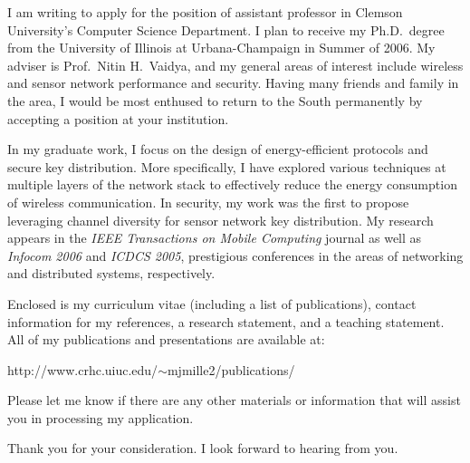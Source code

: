 \documentclass[10pt,stdletter]{newlfm}
\begin{document}
\begin{newlfm}

I am writing to apply for the position of assistant
professor in Clemson University's Computer Science Department.  I plan to receive my
Ph.D.\ degree from the University of Illinois at
Urbana-Champaign in Summer of 2006.  My adviser is
Prof.\ Nitin H.\ Vaidya, and my general areas of interest
include wireless and sensor network performance and security.
 Having many friends and family in the area, I would be
most enthused to return to the South permanently by accepting
a position at your institution.

In my graduate work, I focus on the design of
energy-efficient protocols and secure key distribution.
More specifically, I have explored various techniques at
multiple layers of the network stack to effectively reduce
the energy consumption of wireless communication.  In security,
my work was the first to propose leveraging channel diversity
for sensor network key distribution.  My research appears in 
the \textit{IEEE Transactions on Mobile Computing} journal as
well as \textit{Infocom 2006} and \textit{ICDCS 2005},
prestigious conferences in the areas of networking and distributed
systems, respectively.

Enclosed is my curriculum vitae (including a list of
publications), contact information for my references, a research
statement, and a teaching statement.  All of my publications and
presentations are available at:

http://www.crhc.uiuc.edu/$\sim$mjmille2/publications/

Please let me know if there are any other materials
or information that will assist you in processing my application.

Thank you for your consideration.  I look forward to
hearing from you.

\end{newlfm}
\end{document}
